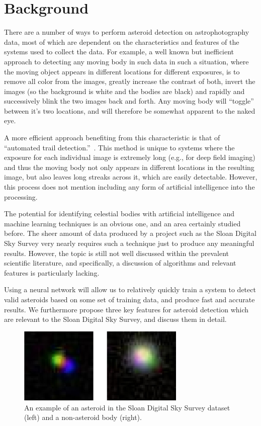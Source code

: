 \documentclass[conference]{IEEEtran}
\begin{document}
\section{Background}
There are a number of ways to perform asteroid detection on astrophotography
data, most of which are dependent on the characteristics and features of the
systems used to collect the data. For example, a well known but inefficient
approach to detecting any moving body in such data in such a situation, where
the moving object appears in different locations for different exposures, is to
remove all color from the images, greatly increase the contrast of both, invert
the images (so the background is white and the bodies are black) and rapidly and
successively blink the two images back and forth. Any moving body will
``toggle'' between it's two locations, and will therefore be somewhat apparent
to the naked eye.

A more efficient approach benefiting from this characteristic is that of
``automated trail detection.''~\cite{And_discoveryof}. This method is unique to
systems where the exposure for each individual image is extremely long (e.g.,
for deep field imaging) and thus the moving body not only appears in different
locations in the resulting image, but also leaves long streaks across it, which
are easily detectable. However, this process does not mention including any form
of artificial intelligence into the processing.

The potential for identifying celestial bodies with artificial intelligence and
machine learning techniques is an obvious one, and an area certainly studied
before. The sheer amount of data produced by a project such as the Sloan
Digital Sky Survey very nearly requires such a technique just to produce any
meaningful results. However, the topic is still not well discussed within the
prevalent scientific literature, and specifically, a discussion of algorithms
and relevant features is particularly lacking.

Using a neural network will allow us to relatively quickly train a system to
detect valid asteroids based on some set of training data, and produce fast and
accurate results. We furthermore propose three key features for asteroid
detection which are relevant to the Sloan Digital Sky Survey, and discuss them
in detail.

\begin{figure}
\centering
\includegraphics[width=80mm]{refs/pair.png}
\caption{An example of an asteroid in the Sloan Digital Sky Survey dataset
(left) and a non-asteroid body (right).}
\end{figure}
\end{document}
